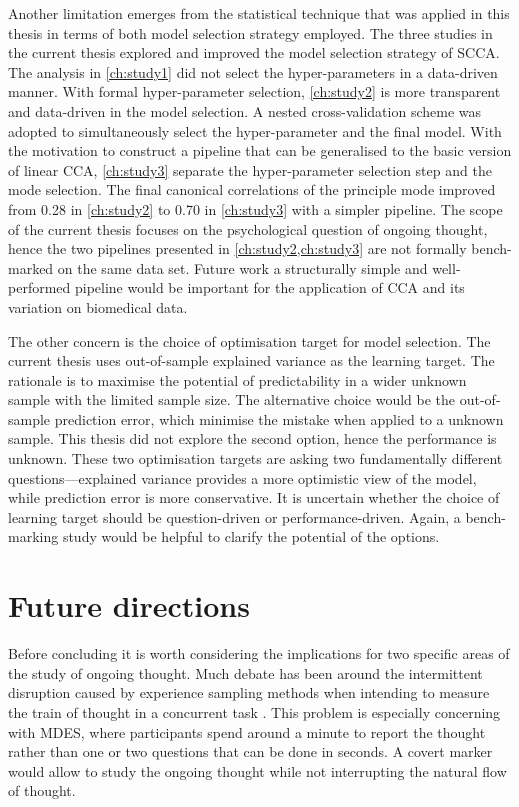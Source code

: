 Another limitation emerges from the statistical technique that was applied in this thesis in terms of both model selection strategy employed. The three studies in the current thesis explored and improved the model selection strategy of SCCA. The analysis in \cref{ch:study1} did not select the hyper-parameters in a data-driven manner. With formal hyper-parameter selection, \cref{ch:study2} is more transparent and data-driven in the model selection. A nested cross-validation scheme was adopted to simultaneously select the hyper-parameter and the final model. With the motivation to construct a pipeline that can be generalised to the basic version of linear CCA, \cref{ch:study3} separate the hyper-parameter selection step and the mode selection. The final canonical correlations of the principle mode improved from 0.28 in \cref{ch:study2} to 0.70 in \cref{ch:study3} with a simpler pipeline. The scope of the current thesis focuses on the psychological question of ongoing thought, hence the two pipelines presented in \cref{ch:study2,ch:study3} are not formally bench-marked on the same data set. Future work a structurally simple and well-performed pipeline would be important for the application of CCA and its variation on biomedical data.

The other concern is the choice of optimisation target for model selection. The current thesis uses out-of-sample explained variance as the learning target. The rationale is to maximise the potential of predictability in a wider unknown sample with the limited sample size. The alternative choice would be the out-of-sample prediction error, which minimise the mistake when applied to a unknown sample. This thesis did not explore the second option, hence the performance is unknown. These two optimisation targets are asking two fundamentally different questions---explained variance provides a more optimistic view of the model, while prediction error is more conservative. It is uncertain whether the choice of learning target should be question-driven or performance-driven. Again, a bench-marking study would be helpful to clarify the potential of the options. 



\section{Future directions}

Before concluding it is worth considering the implications for two specific areas of the study of ongoing thought. Much debate has been around the intermittent disruption caused by experience sampling methods when intending to measure the train of thought in a concurrent task \cite{SmallwoodSchooler2006}. This problem is especially concerning with MDES, where participants spend around a minute to report the thought rather than one or two questions that can be done in seconds. A covert marker would allow to study the ongoing thought while not interrupting the natural flow of thought.

